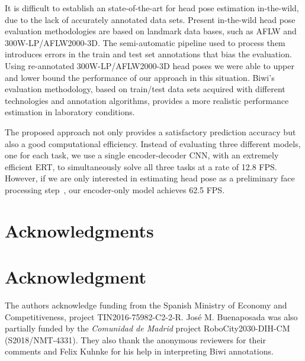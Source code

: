 \documentclass[9pt,technote,compsoc]{IEEEtran}
\begin{document}
It is difficult to establish an state-of-the-art for head pose estimation in-the-wild, due to the lack of accurately annotated data sets. 
Present in-the-wild head pose evaluation methodologies are based on landmark data bases, such as AFLW and 300W-LP/AFLW2000-3D. The semi-automatic pipeline used to process them introduces errors in the train and test set annotations that bias the evaluation. Using re-annotated 300W-LP/AFLW2000-3D head poses we were able to upper and lower bound the performance of our approach in this situation.
Biwi's evaluation methodology, based on train/test data sets acquired with different technologies and annotation algorithms, provides a more realistic performance estimation in laboratory conditions.

The proposed approach not only provides a satisfactory prediction accuracy but also a good computational efficiency. Instead of evaluating three different models, one for each task, we use a single encoder-decoder CNN, with an extremely efficient ERT, to simultaneously solve all three tasks at a rate of 12.8 FPS. However, if we are only interested in estimating head pose as a preliminary face processing step~\cite{Chang17}, our encoder-only model achieves 62.5 FPS.







\ifCLASSOPTIONcompsoc
\section*{Acknowledgments}
\else
\section*{Acknowledgment}
\fi
The authors acknowledge funding from the Spanish Ministry of Economy and Competitiveness, project TIN2016-75982-C2-2-R.
Jos{\'e} M. Buenaposada was also partially funded by the \emph{Comunidad de Madrid} project RoboCity2030-DIH-CM (S2018/NMT-4331). They also thank the anonymous reviewers for their comments and Felix Kuhnke for his help in interpreting Biwi  annotations.



\end{document}
